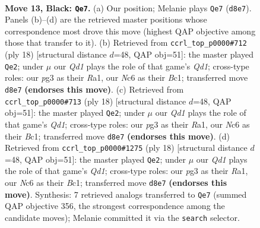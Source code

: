 \documentclass[11pt]{article}
\begin{document}
\clearpage

\begin{figure}[p]\centering
\begin{subfigure}{0.46\textwidth}\centering
\resizebox{\linewidth}{!}{%
\newchessgame
\chessboard[
  setfen={2bq1rk1/1p3p1p/r1n2np1/p1bp4/P7/1P2PNP1/1B3PBP/RN1Q1RK1 b - - 1 13},
  showmover=false,
  pgfstyle=straightmove, color=movearrow, markmove={d8-e7}
]}
\caption{}
\end{subfigure}\hfill
\begin{subfigure}{0.46\textwidth}\centering
\resizebox{\linewidth}{!}{%
\newchessgame
\chessboard[
  setfen={rnbq1rk1/p4ppp/1p2pn2/8/1bBP4/2N2N2/PP3PPP/R1BQ1RK1 w - - 0 10},
  showmover=false,
  pgfstyle=straightmove, color=movearrow, markmove={d1-e2}
]}
\caption{}
\end{subfigure}
\\[4pt]
\begin{subfigure}{0.46\textwidth}\centering
\resizebox{\linewidth}{!}{%
\newchessgame
\chessboard[
  setfen={rnbq1rk1/p4ppp/1p2pn2/8/1bBP4/2N2N2/PP3PPP/R1BQ1RK1 w - - 0 10},
  showmover=false,
  pgfstyle=straightmove, color=movearrow, markmove={d1-e2}
]}
\caption{}
\end{subfigure}\hfill
\begin{subfigure}{0.46\textwidth}\centering
\resizebox{\linewidth}{!}{%
\newchessgame
\chessboard[
  setfen={rnbq1rk1/p4ppp/1p2pn2/8/1bBP4/2N2N2/PP3PPP/R1BQ1RK1 w - - 0 10},
  showmover=false,
  pgfstyle=straightmove, color=movearrow, markmove={d1-e2}
]}
\caption{}
\end{subfigure}
\caption{\textbf{Move 13, Black: \texttt{Qe7}.} (a) Our position; Melanie plays \texttt{Qe7} (\texttt{d8e7}). Panels (b)--(d) are the retrieved master positions whose correspondence most drove this move (highest QAP objective among those that transfer to it). (b) Retrieved from \texttt{ccrl\_top\_p0000\#712} (ply 18) [structural distance $d$=48, QAP obj=51]: the master played \texttt{Qe2}; under $\mu$ our \emph{Qd1} plays the role of that game's \emph{Qd1}; cross-type roles: our \emph{p}g3 as their \emph{R}a1, our \emph{N}c6 as their \emph{B}c1; transferred move \texttt{d8e7} \textbf{(endorses this move)}. (c) Retrieved from \texttt{ccrl\_top\_p0000\#713} (ply 18) [structural distance $d$=48, QAP obj=51]: the master played \texttt{Qe2}; under $\mu$ our \emph{Qd1} plays the role of that game's \emph{Qd1}; cross-type roles: our \emph{p}g3 as their \emph{R}a1, our \emph{N}c6 as their \emph{B}c1; transferred move \texttt{d8e7} \textbf{(endorses this move)}. (d) Retrieved from \texttt{ccrl\_top\_p0000\#1275} (ply 18) [structural distance $d$=48, QAP obj=51]: the master played \texttt{Qe2}; under $\mu$ our \emph{Qd1} plays the role of that game's \emph{Qd1}; cross-type roles: our \emph{p}g3 as their \emph{R}a1, our \emph{N}c6 as their \emph{B}c1; transferred move \texttt{d8e7} \textbf{(endorses this move)}. Synthesis: 7 retrieved analogs transferred to \texttt{Qe7} (summed QAP objective 356, the strongest correspondence among the candidate moves); Melanie committed it via the \texttt{search} selector.}
\label{fig:thought-m25}
\end{figure}
\end{document}
